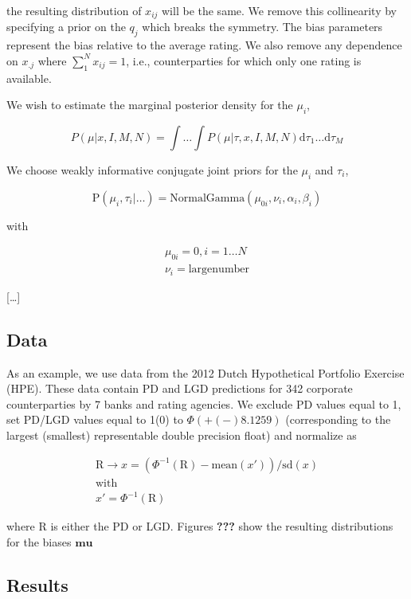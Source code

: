 \documentclass[]{article}
\begin{document}
the resulting distribution of $x_{ij}$ will be the same. We remove this
collinearity by specifying a prior on the $q_j$ which breaks the
symmetry. The bias parameters represent the bias relative to the average
rating. We also remove any dependence on $x_{.j}$ where
$\sum_1^N x_{ij}=1$, i.e., counterparties for which only one rating is
available.

We wish to estimate the marginal posterior density for the $\mu_i$,

\[P(\mu|x,I,M,N)=\int\dots\int P(\mu|\tau,x,I,M,N)\mathrm{d}\tau_1 \dots \mathrm{d}\tau_M\]

We choose weakly informative conjugate joint priors for the $\mu_i$ and
$\tau_i$,

\[\mathrm{P}(\mu_i,\tau_i|\dots)=\mathrm{NormalGamma}(\mu_{0i},\nu_i,\alpha_i,\beta_i)\]

with

\[\begin{matrix} \mu_{0i}=0, i=1\dots N \\ \nu_i = \mathrm{large number}\end{matrix}\]

{[}\ldots{}{]}

\subsection{Data}\label{data}

As an example, we use data from the 2012 Dutch Hypothetical Portfolio
Exercise (HPE). These data contain PD and LGD predictions for 342
corporate counterparties by 7 banks and rating agencies. We exclude PD
values equal to 1, set PD/LGD values equal to 1(0) to $\Phi(+(-)8.1259)$
(corresponding to the largest (smallest) representable double precision
float) and normalize as

\[ \begin{matrix} \mathrm{R} \to x = (\Phi^{-1}(\mathrm{R}) - \mathrm{mean}(x')) / \mathrm{sd}(x) \\ \mathrm{with} \\ x' = \Phi^{-1}(\mathrm{R})  \end{matrix} \]

where $\mathrm{R}$ is either the PD or LGD. Figures \textbf{???} show
the resulting distributions for the biases $\mathbf{mu}$

\subsection{Results}\label{results}
\end{document}
